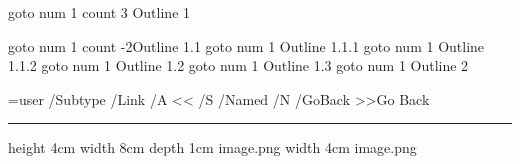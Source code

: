 \pdfoutline             %
    goto num 1          %
    count 3             %
    {Outline 1}         %

    \pdfoutline goto num 1 count -2{Outline 1.1}
        \pdfoutline goto num 1 {Outline 1.1.1}
        \pdfoutline goto num 1 {Outline 1.1.2}
    \pdfoutline goto num 1 {Outline 1.2}
    \pdfoutline goto num 1 {Outline 1.3}
\pdfoutline goto num 1 {Outline 2}

\vfil\eject
\footline={\pdfannotlink user {/Subtype /Link /A << /S /Named /N /GoBack >>}\Cyan Go Back\Black \pdfendlink\hfil \folio}

\hrule
\pdfimage               %
    height 4cm          %
    width  8cm          %
    depth  1cm          %
    {image.png}         %
\bigskip
\pdfimage               %
    width 4cm           %
   {image.png}          %

